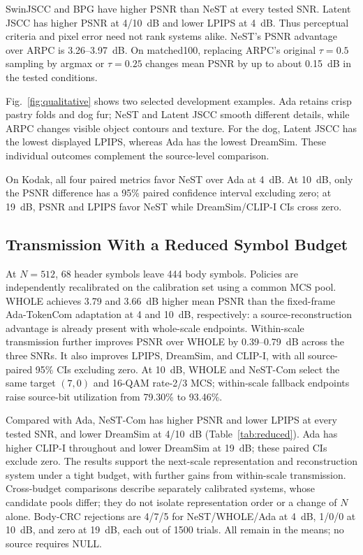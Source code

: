SwinJSCC and BPG have higher PSNR than NeST at every tested SNR. Latent JSCC has higher PSNR at 4/10~dB and lower LPIPS at 4~dB. Thus perceptual criteria and pixel error need not rank systems alike. NeST's PSNR advantage over ARPC is 3.26--3.97~dB. On matched100, replacing ARPC's original $\tau=0.5$ sampling by argmax or $\tau=0.25$ changes mean PSNR by up to about 0.15~dB in the tested conditions.

Fig.~\ref{fig:qualitative} shows two selected development examples. Ada retains crisp pastry folds and dog fur; NeST and Latent JSCC smooth different details, while ARPC changes visible object contours and texture. For the dog, Latent JSCC has the lowest displayed LPIPS, whereas Ada has the lowest DreamSim. These individual outcomes complement the source-level comparison.

On Kodak, all four paired metrics favor NeST over Ada at 4~dB. At 10~dB, only the PSNR difference has a 95\% paired confidence interval excluding zero; at 19~dB, PSNR and LPIPS favor NeST while DreamSim/CLIP-I CIs cross zero.

\subsection{Transmission With a Reduced Symbol Budget}

At $N=512$, 68 header symbols leave 444 body symbols. Policies are independently recalibrated on the calibration set using a common MCS pool. WHOLE achieves 3.79 and 3.66~dB higher mean PSNR than the fixed-frame Ada-TokenCom adaptation at 4 and 10~dB, respectively: a source-reconstruction advantage is already present with whole-scale endpoints. Within-scale transmission further improves PSNR over WHOLE by 0.39--0.79~dB across the three SNRs. It also improves LPIPS, DreamSim, and CLIP-I, with all source-paired 95\% CIs excluding zero. At 10~dB, WHOLE and NeST-Com select the same target $(7,0)$ and 16-QAM rate-2/3 MCS; within-scale fallback endpoints raise source-bit utilization from 79.30\% to 93.46\%.

Compared with Ada, NeST-Com has higher PSNR and lower LPIPS at every tested SNR, and lower DreamSim at 4/10~dB (Table~\ref{tab:reduced}). Ada has higher CLIP-I throughout and lower DreamSim at 19~dB; these paired CIs exclude zero. The results support the next-scale representation and reconstruction system under a tight budget, with further gains from within-scale transmission. Cross-budget comparisons describe separately calibrated systems, whose candidate pools differ; they do not isolate representation order or a change of $N$ alone. Body-CRC rejections are 4/7/5 for NeST/WHOLE/Ada at 4~dB, 1/0/0 at 10~dB, and zero at 19~dB, each out of 1500 trials. All remain in the means; no source requires NULL.

